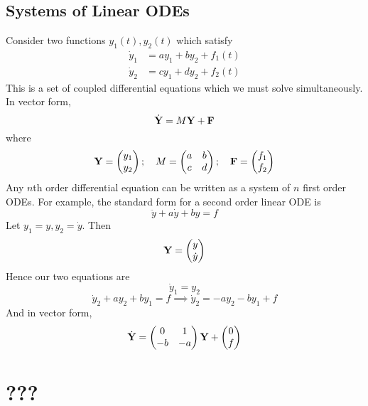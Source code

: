 \documentclass{article}
\begin{document}
\subsection{Systems of Linear ODEs}
Consider two functions $y_1(t), y_2(t)$ which satisfy
\begin{align*}
	\dot y_1 & = ay_1 + by_2 + f_1(t) \\
	\dot y_2 & = cy_1 + dy_2 + f_2(t)
\end{align*}
This is a set of coupled differential equations which we must solve simultaneously. In vector form,
\[ \dot{\vb Y} = M\vb Y + \vb F \]
where
\[ \vb Y = \begin{pmatrix}
		y_1 \\ y_2
	\end{pmatrix};\quad M = \begin{pmatrix}
		a & b \\ c & d
	\end{pmatrix};\quad \vb F = \begin{pmatrix}
		f_1 \\ f_2
	\end{pmatrix} \]
Any $n$th order differential equation can be written as a system of $n$ first order ODEs. For example, the standard form for a second order linear ODE is
\[ \ddot y + a\dot y + by = f \]
Let $y_1 = y, y_2 = \dot y$. Then
\[ \vb Y = \begin{pmatrix}
		y \\ \dot y
	\end{pmatrix} \]
Hence our two equations are
\[ \dot y_1 = y_2 \]
\[ \dot y_2 + ay_2 + by_1 = f \implies \dot y_2 = -ay_2 - by_1 + f \]
And in vector form,
\[ \dot{\vb Y} = \begin{pmatrix}
		0  & 1  \\
		-b & -a
	\end{pmatrix} \vb Y + \begin{pmatrix}
		0 \\ f
	\end{pmatrix} \]

\section{???}
\end{document}
